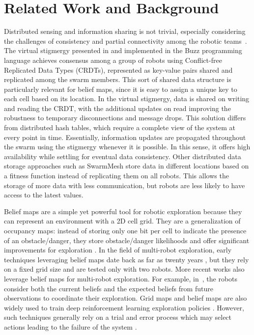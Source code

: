 \documentclass[letterpaper, 10 pt, conference]{ieeeconf}
\begin{document}
\section{Related Work and Background}
Distributed sensing and information sharing is not trivial, especially considering
the challenges of consistency and partial connectivity among the
robotic teams~\cite{amigoni2017multirobot,otte2018emergent}. The virtual stigmergy
presented in \cite{pinciroliTuple2016} and implemented in the Buzz
programming language \cite{pinciroliBuzz2016} achieves consensus among
a group of robots using Conflict-free Replicated Data Types (CRDTs),
represented as key-value pairs shared and replicated among the swarm members. This sort of shared data structure is
particularly relevant for belief maps, since it is easy to assign a
unique key to each cell based on its location.  In the virtual
stigmergy, data is shared on writing and reading the CRDT, with the
additional updates on read improving the robustness to temporary
disconnections and message drops. This solution differs from
distributed hash tables, which require a complete view of the system
at every point in time. Essentially, information updates are propagated throughout the swarm using the stigmergy whenever it is possible. In this sense, it offers high availability while settling for eventual data consistency. Other distributed data storage approaches such
as SwarmMesh \cite{majcherczykSwarmmesh2020} store data in different
locations based on a fitness function instead of replicating them on
all robots. This allows the storage of more data with less
communication, but robots are less likely to have access to the latest
values.

Belief maps are a simple yet powerful tool for robotic exploration
because they can represent an environment with a 2D cell grid. They
are a generalization of occupancy maps: instead of storing only one
bit per cell to indicate the presence of an obstacle/danger, they
store obstacle/danger likelihoods and offer significant improvements
for exploration \cite{stachnissMappingExplorationMobile2003}. In the
field of multi-robot exploration, early techniques leveraging belief
maps date back as far as twenty years
\cite{kobayashiSharingExploringInformation2002,kobayashiDeterminationExplorationTarget2003},
but they rely on a fixed grid size and are tested only with two
robots. More recent works also leverage belief maps for multi-robot
exploration. For example,
in~\cite{indelmanCooperativeMultirobotBelief2018}, the robots consider
both the current beliefs and the expected beliefs from future
observations to coordinate their exploration. Grid maps and belief
maps are also widely used to train deep reinforcement learning
exploration policies
\cite{hanGridWiseControlMultiAgent,panovGridPathPlanning2018}. However, such
techniques generally rely on a trial and error process which may select actions leading to the failure of the system \cite{garciaSafeExplorationState2012,andersenSafeReinforcementlearningIndustrial2020}.
\end{document}
